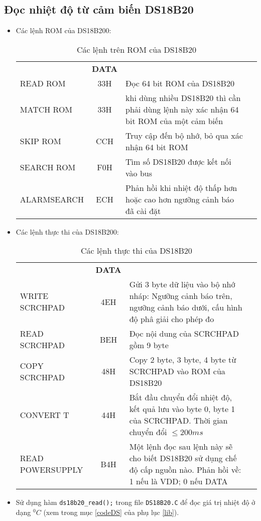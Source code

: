 \subsection{Đọc nhiệt độ từ cảm biến DS18B20}
\begin{itemize}
\item Các lệnh ROM của DS18B200:
\begin{table}[!h]
\begin{center}
\begin{tabular}{|l|c|p{9cm}|l}\cline{1-3}
\centering{\textbf{Tên lệnh}} & \textbf{DATA} & \centering{\textbf{Chức năng}} & \\ \cline{1-3}
READ ROM & 33H & Đọc 64 bit ROM của DS18B20 \\ \hline
MATCH ROM & 33H & khi dùng nhiều DS18B20 thì cần phải dùng lệnh này xác nhận 64 bit ROM của một cảm biến& \\ \cline{1-3}
SKIP ROM & CCH & Truy cập đến bộ nhớ, bỏ qua xác nhận 64 bit ROM & \\ \cline{1-3}
SEARCH ROM & F0H & Tìm số DS18B20 được kết nối vào bus& \\ \cline{1-3}
ALARMSEARCH & ECH & Phản hồi khi nhiệt độ thấp hơn hoặc cao hơn ngưỡng cảnh báo đã cài đặt & \\ \cline{1-3}
\end{tabular}
\end{center}
\caption{Các lệnh trên ROM của DS18B20}
\end{table}
\newpage
\item Các lệnh thực thi của DS18B200:
\begin{table}[!h]
\begin{center}
\begin{tabular}{|l|c|p{9cm}|l}\cline{1-3}
\centering{\textbf{Tên lệnh}} & \textbf{DATA} & \centering{\textbf{Chức năng}} & \\ \cline{1-3}
WRITE SCRCHPAD & 4EH & Gửi 3 byte dữ liệu vào bộ nhớ nháp: Ngưỡng cảnh báo trên, ngưỡng cảnh báo dưới, cấu hình độ phâ giải cho phép đo & \\ \cline{1-3}
READ SCRCHPAD & BEH & Đọc nội dung của SCRCHPAD gồm 9 byte & \\ \cline{1-3}
COPY SCRCHPAD & 48H & Copy 2 byte, 3 byte, 4 byte từ SCRCHPAD vào ROM của DS18B20 & \\ \cline{1-3}
CONVERT T & 44H & Bắt đầu chuyển đổi nhiệt độ, kết quả lưu vào byte 0, byte 1 của SCRCHPAD. Thời gian chuyển đổi $\leq 200ms$& \\ \cline{1-3}
READ POWERSUPPLY & B4H & Một lệnh đọc sau lệnh này sẽ cho biết DS18B20 sử dụng chế độ cấp nguồn nào. Phản hồi về: 1 nếu là VDD; 0 nếu DATA & \\ \cline{1-3}
\end{tabular}
\end{center}
\caption{Các lệnh thực thi của DS18B20}
\end{table}
\item Sử dụng hàm \verb|ds18b20_read();| trong file \verb|DS18B20.C| để đọc giá trị nhiệt độ ở dạng $^0C$ (xem trong mục \ref{codeDS} của phụ lục \ref{lib}).
\end{itemize}
